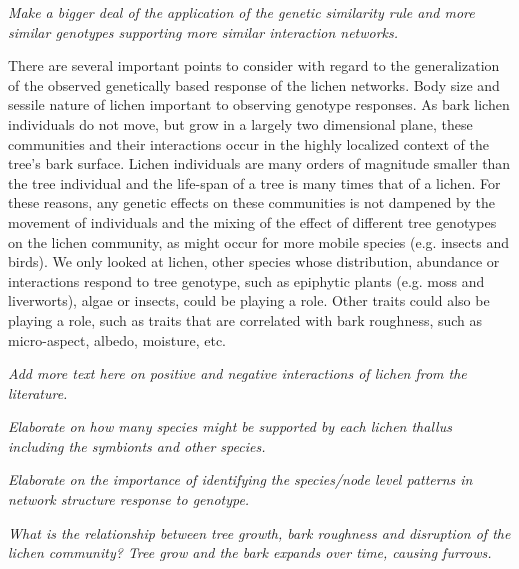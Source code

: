 \documentclass[11pt,twocolumn,twoside,lineno]{pnas-new}
\begin{document}
\textit{Make a bigger deal of the application of the genetic
  similarity rule and more similar genotypes supporting more similar
  interaction networks.}

There are several important points to consider with regard to the
generalization of the observed genetically based response of the
lichen networks. Body size and sessile nature of lichen important to
observing genotype responses. As bark lichen individuals do not move,
but grow in a largely two dimensional plane, these communities and
their interactions occur in the highly localized context of the tree's
bark surface. Lichen individuals are many orders of magnitude smaller
than the tree individual and the life-span of a tree is many times
that of a lichen. For these reasons, any genetic effects on these
communities is not dampened by the movement of individuals and the
mixing of the effect of different tree genotypes on the lichen
community, as might occur for more mobile species (e.g. insects and
birds). We only looked at lichen, other species whose distribution,
abundance or interactions respond to tree genotype, such as epiphytic
plants (e.g. moss and liverworts), algae or insects, could be playing
a role. Other traits could also be playing a role, such as traits that
are correlated with bark roughness, such as micro-aspect, albedo,
moisture, etc.





\textit{Add more text here on positive and negative interactions of
  lichen from the literature.} 


\textit{Elaborate on how many species might be supported by each
  lichen thallus including the symbionts and other species.}


\textit{Elaborate on the importance of identifying the species/node
  level patterns in network structure response to genotype.}


\textit{What is the relationship between tree growth, bark roughness
  and disruption of the lichen community? Tree grow and the bark
  expands over time, causing furrows. }
\end{document}
